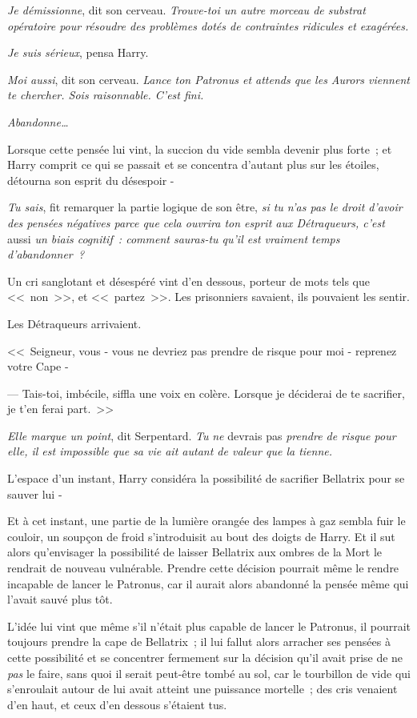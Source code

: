 \emph{Je démissionne}, dit son cerveau. \emph{Trouve-toi un autre morceau de substrat opératoire pour résoudre des problèmes dotés de contraintes ridicules et exagérées.}

\emph{Je suis sérieux}, pensa Harry.

\emph{Moi aussi}, dit son cerveau. \emph{Lance ton Patronus et attends que les Aurors viennent te chercher. Sois raisonnable. C'est fini.}

\emph{Abandonne…}

Lorsque cette pensée lui vint, la succion du vide sembla devenir plus forte~; et Harry comprit ce qui se passait et se concentra d'autant plus sur les étoiles, détourna son esprit du désespoir -

\emph{Tu sais}, fit remarquer la partie logique de son être, \emph{si tu n'as pas le droit d'avoir des pensées négatives parce que cela ouvrira ton esprit aux Détraqueurs, c'est} aussi \emph{un biais cognitif~: comment sauras-tu qu'il est vraiment temps d'abandonner~?}

Un cri sanglotant et désespéré vint d'en dessous, porteur de mots tels que <<~non~>>, et <<~partez~>>. Les prisonniers savaient, ils pouvaient les sentir.

Les Détraqueurs arrivaient.

<<~Seigneur, vous - vous ne devriez pas prendre de risque pour moi - reprenez votre Cape -

--- Tais-toi, imbécile, siffla une voix en colère. Lorsque je déciderai de te sacrifier, je t'en ferai part.~>>

\emph{Elle marque un point}, dit Serpentard. \emph{Tu} \emph{ne} devrais pas \emph{prendre de risque pour elle, il est impossible que sa vie ait autant de valeur que la tienne.}

L'espace d'un instant, Harry considéra la possibilité de sacrifier Bellatrix pour se sauver lui -

Et à cet instant, une partie de la lumière orangée des lampes à gaz sembla fuir le couloir, un soupçon de froid s'introduisit au bout des doigts de Harry. Et il sut alors qu'envisager la possibilité de laisser Bellatrix aux ombres de la Mort le rendrait de nouveau vulnérable. Prendre cette décision pourrait même le rendre incapable de lancer le Patronus, car il aurait alors abandonné la pensée même qui l'avait sauvé plus tôt.

L'idée lui vint que même s'il n'était plus capable de lancer le Patronus, il pourrait toujours prendre la cape de Bellatrix~; il lui fallut alors arracher ses pensées à cette possibilité et se concentrer fermement sur la décision qu'il avait prise de ne \emph{pas} le faire, sans quoi il serait peut-être tombé au sol, car le tourbillon de vide qui s'enroulait autour de lui avait atteint une puissance mortelle~; des cris venaient d'en haut, et ceux d'en dessous s'étaient tus.

